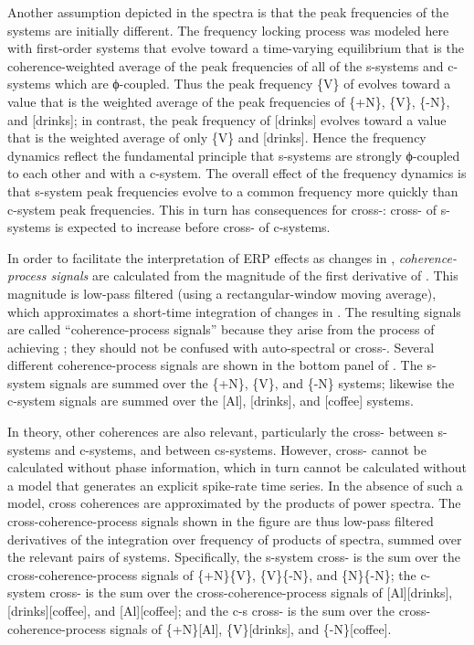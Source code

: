 Another assumption depicted in the spectra is that the peak frequencies of the systems are initially different. The frequency locking process was modeled here with first-order systems that evolve toward a time-varying equilibrium that is the coherence-weighted average of the peak frequencies of all of the s-systems and c-systems which are ϕ-coupled. Thus the peak frequency \{V\} of evolves toward a value that is the weighted average of the peak frequencies of \{+N\}, \{V\}, \{-N\}, and [drinks]; in contrast, the peak frequency of [drinks] evolves toward a value that is the weighted average of only \{V\} and [drinks]. Hence the frequency dynamics reflect the fundamental principle that s-systems are strongly ϕ-coupled to each other and  with a c-system. The overall effect of the frequency dynamics is that s-system peak frequencies evolve to a common frequency more quickly than c-system peak frequencies. This in turn has consequences for cross-: cross- of s-systems is expected to increase before cross- of c-systems.

  In order to facilitate the interpretation of ERP effects as changes in , \textit{coherence-process signals} are calculated from the magnitude of the first derivative of . This magnitude is low-pass filtered (using a rectangular-window moving average), which approximates a short-time integration of changes in . The resulting signals are called “coherence-process signals” because they arise from the process of achieving ; they should not be confused with auto-spectral or cross-. Several different coherence-process signals are shown in the bottom panel of {}. The s-system  signals are summed over the \{+N\}, \{V\}, and \{-N\} systems; likewise the c-system signals are summed over the [Al], [drinks], and [coffee] systems. 
  
  In theory, other coherences are also relevant, particularly the cross- between s-systems and c-systems, and between cs-systems. However, cross- cannot be calculated without phase information, which in turn cannot be calculated without a model that generates an explicit spike-rate time series. In the absence of such a model, cross coherences are approximated by the products of power spectra. The cross-coherence-process signals shown in the figure are thus low-pass filtered derivatives of the integration over frequency of products of spectra, summed over the relevant pairs of systems. Specifically, the s-system cross- is the sum over the cross-coherence-process signals of \{+N\}\{V\}, \{V\}\{-N\}, and \{N\}\{-N\}; the c-system cross- is the sum over the cross-coherence-process signals of [Al][drinks], [drinks][coffee], and [Al][coffee]; and the c-s cross- is the sum over the cross-coherence-process signals of \{+N\}[Al], \{V\}[drinks], and \{-N\}[coffee]. 

